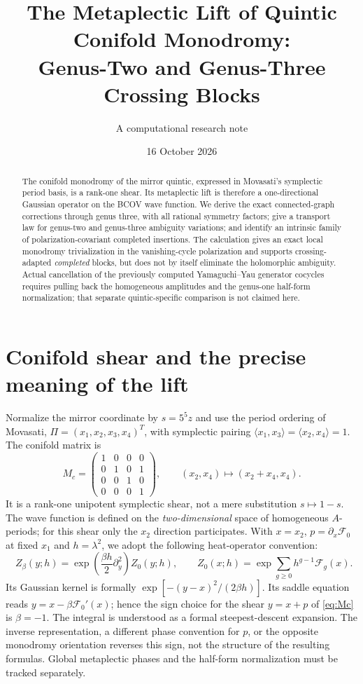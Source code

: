 \documentclass[11pt,letterpaper]{article}
\title{The Metaplectic Lift of Quintic Conifold Monodromy:\\Genus-Two and Genus-Three Crossing Blocks}
\author{A computational research note}
\date{16 October 2026}
\begin{document}
\maketitle
\begin{abstract}
The conifold monodromy of the mirror quintic, expressed in Movasati's symplectic period basis, is a rank-one shear. Its metaplectic lift is therefore a one-directional Gaussian operator on the BCOV wave function. We derive the exact connected-graph corrections through genus three, with all rational symmetry factors; give a transport law for genus-two and genus-three ambiguity variations; and identify an intrinsic family of polarization-covariant completed insertions. The calculation gives an exact local monodromy trivialization in the vanishing-cycle polarization and supports crossing-adapted \emph{completed} blocks, but does not by itself eliminate the holomorphic ambiguity. Actual cancellation of the previously computed Yamaguchi--Yau generator cocycles requires pulling back the homogeneous amplitudes and the genus-one half-form normalization; that separate quintic-specific comparison is not claimed here.
\end{abstract}

\section{Conifold shear and the precise meaning of the lift}
Normalize the mirror coordinate by $s=5^5z$ and use the period ordering of Movasati,
$\Pi=(x_1,x_2,x_3,x_4)^T$, with symplectic pairing $\langle x_1,x_3\rangle=\langle x_2,x_4\rangle=1$. The conifold matrix is
\begin{equation}
M_c=\begin{pmatrix}1&0&0&0\\0&1&0&1\\0&0&1&0\\0&0&0&1\end{pmatrix},\qquad
(x_2,x_4)\longmapsto(x_2+x_4,x_4).
\label{eq:Mc}
\end{equation}
It is a rank-one unipotent symplectic shear, not a mere substitution $s\mapsto1-s$. The wave function is defined on the \emph{two-dimensional} space of homogeneous $A$-periods; for this shear only the $x_2$ direction participates. With $x=x_2$, $p=\partial_x\mathcal F_0$ at fixed $x_1$ and $h=\lambda^2$, we adopt the following heat-operator convention:
\begin{equation}
\boxed{\quad Z_\beta(y;h)=\exp\!\left(\frac{\beta h}{2}\partial_y^2\right)Z_0(y;h),\qquad
Z_0(x;h)=\exp\sum_{g\geq0}h^{g-1}\mathcal F_g(x).\quad}
\label{eq:heat}
\end{equation}
Its Gaussian kernel is formally $\exp[-(y-x)^2/(2\beta h)]$. Its saddle equation reads $y=x-\beta\mathcal F_0'(x)$; hence the sign choice for the shear $y=x+p$ of \eqref{eq:Mc} is $\beta=-1$. The integral is understood as a formal steepest-descent expansion. The inverse representation, a different phase convention for $p$, or the opposite monodromy orientation reverses this sign, not the structure of the resulting formulas. Global metaplectic phases and the half-form normalization must be tracked separately.
\end{document}
